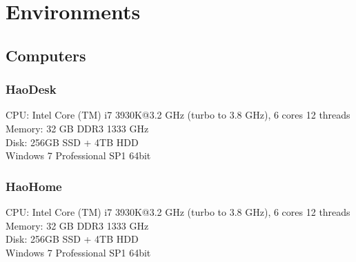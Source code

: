 \section{Environments}

\subsection{Computers}
\subsubsection{HaoDesk}
\label{HaoDesk}

CPU: Intel Core (TM) i7 3930K@3.2 GHz (turbo to 3.8 GHz), 6 cores 12 threads\\
Memory: 32 GB DDR3 1333 GHz\\
Disk: 256GB SSD + 4TB HDD\\ 
Windows 7 Professional SP1 64bit


\subsubsection{HaoHome}
\label{HaoHome}

CPU: Intel Core (TM) i7 3930K@3.2 GHz (turbo to 3.8 GHz), 6 cores 12 threads\\
Memory: 32 GB DDR3 1333 GHz\\
Disk: 256GB SSD + 4TB HDD\\ 
Windows 7 Professional SP1 64bit


 

